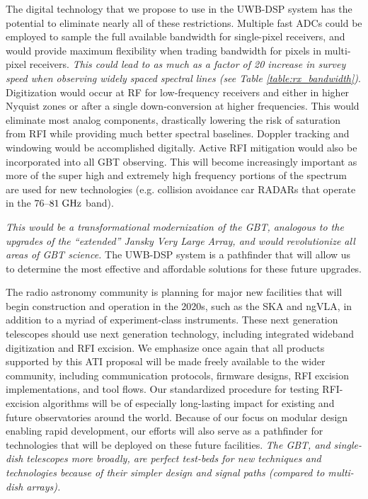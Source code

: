 \documentclass[10pt]{myNSF}
\begin{document}
The digital technology that we propose to use in the UWB-DSP system
has the potential to eliminate nearly all of these restrictions.
Multiple fast ADCs could be employed to sample the full available
bandwidth for single-pixel receivers, and would provide maximum
flexibility when trading bandwidth for pixels in multi-pixel
receivers.  \emph{This could lead to as much as a factor of 20
  increase in survey speed when observing widely spaced spectral lines
  (see Table \ref{table:rx_bandwidth})}.  Digitization would occur at
RF for low-frequency receivers and either in higher Nyquist zones or
after a single down-conversion at higher frequencies.  This would
eliminate most analog components, drastically lowering the risk of
saturation from RFI while providing much better spectral baselines.
Doppler tracking and windowing would be accomplished digitally.
Active RFI mitigation would also be incorporated into all GBT
observing.  This will become increasingly important as more of the
super high and extremely high frequency portions of the spectrum are
used for new technologies (e.g. collision avoidance car RADARs that
operate in the $76$--$81\; \textrm{GHz}$ band).

\emph{This would be a transformational modernization of
  the GBT, analogous to the upgrades of the ``extended'' Jansky Very
  Large Array, and would revolutionize all areas of GBT science.}  The
UWB-DSP system is a pathfinder that will allow us to determine the
most effective and affordable solutions for these future upgrades.


The radio astronomy community is planning for major new facilities
that will begin construction and operation in the 2020s, such as the
SKA and ngVLA, in addition to a myriad of experiment-class
instruments.  These next generation telescopes should use next
generation technology, including integrated wideband digitization and
RFI excision.  We emphasize once again that all products supported by
this ATI proposal will be made freely available to the wider
community, including communication protocols, firmware designs, RFI
excision implementations, and tool flows.  Our standardized procedure
for testing RFI-excision algorithms will be of especially long-lasting
impact for existing and future observatories around the world.
Because of our focus on modular design enabling rapid development, our
efforts will also serve as a pathfinder for technologies that will be
deployed on these future facilities.  \emph{The GBT, and single-dish
  telescopes more broadly, are perfect test-beds for new techniques
  and technologies because of their simpler design and signal paths
  (compared to multi-dish arrays).}
\end{document}
